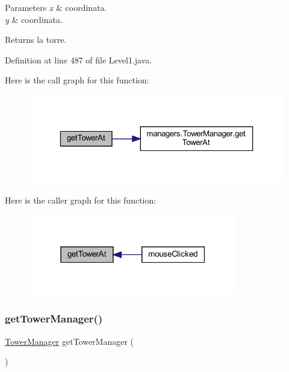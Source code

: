 \begin{DoxyParams}{Parameters}
{\em x} & coordinata. \\
\hline
{\em y} & coordinata.\\
\hline
\end{DoxyParams}
\begin{DoxyReturn}{Returns}
la torre. 
\end{DoxyReturn}


Definition at line 487 of file Level1.\+java.

Here is the call graph for this function\+:
\nopagebreak
\begin{figure}[H]
\begin{center}
\leavevmode
\includegraphics[width=323pt]{classscenes_1_1_level1_a4345f2e80059788e5ab1dd1cf0ff2c04_cgraph}
\end{center}
\end{figure}
Here is the caller graph for this function\+:\nopagebreak
\begin{figure}[H]
\begin{center}
\leavevmode
\includegraphics[width=259pt]{classscenes_1_1_level1_a4345f2e80059788e5ab1dd1cf0ff2c04_icgraph}
\end{center}
\end{figure}
\mbox{\label{classscenes_1_1_level1_a6fff8a01141127e3c2897a077e5dee92}} 
\subsubsection{\texorpdfstring{get\+Tower\+Manager()}{getTowerManager()}}
{\footnotesize\ttfamily \hyperlink{classmanagers_1_1_tower_manager}{Tower\+Manager} get\+Tower\+Manager (\begin{DoxyParamCaption}{ }\end{DoxyParamCaption})}



